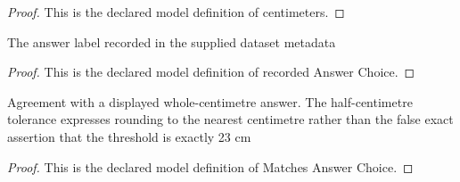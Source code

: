 \begin{proof}
  This is the declared model definition of centimeters.
\end{proof}
\begin{definition}
  \label{def:physics:phyx-mini-0258:phyxminiproblems-problemphyxmini0258-recordedanswerchoice}
  The answer label recorded in the supplied dataset metadata
\end{definition}
\begin{proof}
  This is the declared model definition of recorded Answer Choice.
\end{proof}
\begin{definition}
  \label{def:physics:phyx-mini-0258:phyxminiproblems-problemphyxmini0258-matchesanswerchoice}
  Agreement with a displayed whole-centimetre answer. The half-centimetre tolerance expresses rounding to the nearest centimetre rather than the false exact assertion that the threshold is exactly 23 cm
\end{definition}
\begin{proof}
  This is the declared model definition of Matches Answer Choice.
\end{proof}
